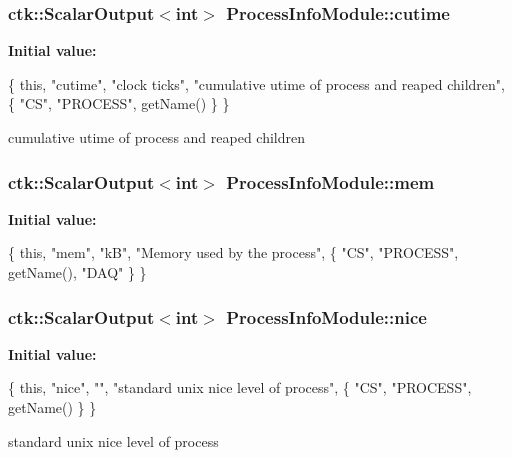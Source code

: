 \subsubsection[{\texorpdfstring{cutime}{cutime}}]{\setlength{\rightskip}{0pt plus 5cm}ctk\+::\+Scalar\+Output$<$int$>$ Process\+Info\+Module\+::cutime}\hypertarget{structProcessInfoModule_acc12e39ff6f0005bf2bdb37213ddc3db}{}\label{structProcessInfoModule_acc12e39ff6f0005bf2bdb37213ddc3db}
{\bfseries Initial value\+:}
\begin{DoxyCode}
\{ \textcolor{keyword}{this}, \textcolor{stringliteral}{"cutime"}, \textcolor{stringliteral}{"clock ticks"},
      \textcolor{stringliteral}{"cumulative utime of process and reaped children"},
    \{ \textcolor{stringliteral}{"CS"}, \textcolor{stringliteral}{"PROCESS"}, getName() \} \}
\end{DoxyCode}
cumulative utime of process and reaped children 
\subsubsection[{\texorpdfstring{mem}{mem}}]{\setlength{\rightskip}{0pt plus 5cm}ctk\+::\+Scalar\+Output$<$int$>$ Process\+Info\+Module\+::mem}\hypertarget{structProcessInfoModule_ad2ccbde90572f3a38125a60f6588faf3}{}\label{structProcessInfoModule_ad2ccbde90572f3a38125a60f6588faf3}
{\bfseries Initial value\+:}
\begin{DoxyCode}
\{ \textcolor{keyword}{this}, \textcolor{stringliteral}{"mem"}, \textcolor{stringliteral}{"kB"}, \textcolor{stringliteral}{"Memory used by the process"},
    \{ \textcolor{stringliteral}{"CS"}, \textcolor{stringliteral}{"PROCESS"}, getName(), \textcolor{stringliteral}{"DAQ"} \} \}
\end{DoxyCode}
\subsubsection[{\texorpdfstring{nice}{nice}}]{\setlength{\rightskip}{0pt plus 5cm}ctk\+::\+Scalar\+Output$<$int$>$ Process\+Info\+Module\+::nice}\hypertarget{structProcessInfoModule_a8ba8efe92809d50ac68d49c0a9cf16e0}{}\label{structProcessInfoModule_a8ba8efe92809d50ac68d49c0a9cf16e0}
{\bfseries Initial value\+:}
\begin{DoxyCode}
\{ \textcolor{keyword}{this}, \textcolor{stringliteral}{"nice"}, \textcolor{stringliteral}{""}, \textcolor{stringliteral}{"standard unix nice level of process"},
    \{ \textcolor{stringliteral}{"CS"}, \textcolor{stringliteral}{"PROCESS"}, getName() \} \}
\end{DoxyCode}
standard unix nice level of process 
